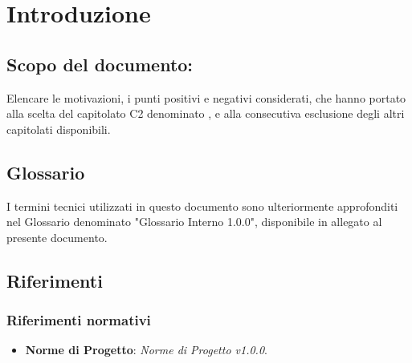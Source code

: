 \section{Introduzione}

\subsection{Scopo del documento:}
Elencare le motivazioni, i punti positivi e negativi considerati, che hanno portato alla scelta del capitolato C2 denominato \NomeProgetto, e alla consecutiva esclusione degli altri capitolati disponibili.

\subsection{Glossario}
I termini tecnici utilizzati in questo documento sono ulteriormente approfonditi nel Glossario denominato "Glossario Interno 1.0.0", disponibile in allegato al presente documento.

\subsection{Riferimenti}

	\subsubsection{Riferimenti normativi}
	\begin{itemize}
		\item \textbf{Norme di Progetto}: \textit{Norme di Progetto v1.0.0}.
	\end{itemize}
		
